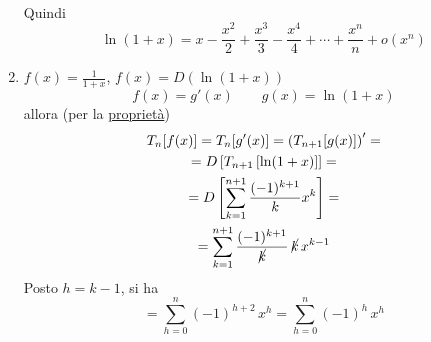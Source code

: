 \begin{enumerate}
\begin{gather*}
    \end{gather*}
    Quindi \[
        \ln(1+x)=x-\frac{x^{2}}{2}+\frac{x^{3}}{3}-\frac{x^{4}}{4}+\cdots+ \frac{x^{n}}{n}+ o(x^n)
    \]
    \item $ f(x)=\frac{1}{1+x} $, $ f(x)=D\left(\ln(1+x)\right) $ \[
        f(x)=g'(x)\qquad g(x)=\ln (1+x)
    \]
    allora (per la \hyperref[proprietaettte]{proprietà})
    \begin{multline*}
        T_{n}[f(x)]=T_{n}[g'(x)]=\left(T_{n+1}[g(x)] \right)'=\\
        = D\left[T_{n+1}\left[\ln (1+x)\right] \right] =\\=
        D\left[\sum_{k=1}^{n+1}\frac{(-1)^{k+1}}{k}x^{k} \right] =\\
        =\sum_{k=1}^{n+1}\frac{(-1)^{k+1}}{\cancel{k}} \, \cancel{k}\,x^{k-1}
    \end{multline*}
    Posto $ h=k-1 $, si ha \[
        =\sum_{h=0}^{n}(-1)^{h+2}\,x^{h}=\sum_{h=0}^{n} (-1)^{h}\,x^{h}  
    \]


\end{enumerate}
